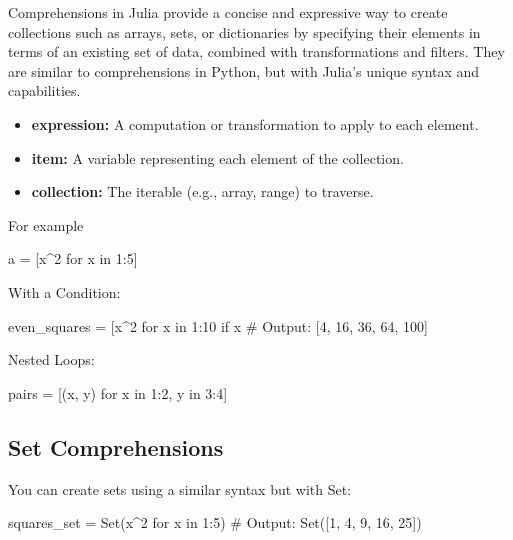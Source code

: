 \documentclass{report}
\begin{document}
     \pagebreak 
     \bigbreak \noindent 
     Comprehensions in Julia provide a concise and expressive way to create collections such as arrays, sets, or dictionaries by specifying their elements in terms of an existing set of data, combined with transformations and filters. They are similar to comprehensions in Python, but with Julia's unique syntax and capabilities.
     \bigbreak \noindent 
     \begin{jlcode}
     \end{jlcode}
     \begin{itemize}
         \item \textbf{expression:} A computation or transformation to apply to each element.
         \item \textbf{item:} A variable representing each element of the collection.
         \item \textbf{collection:} The iterable (e.g., array, range) to traverse.
     \end{itemize}
     For example
     \bigbreak \noindent 
     \begin{jlcode}
         a = [x^2 for x in 1:5]
     \end{jlcode}
     \bigbreak \noindent 
     With a Condition:
     \bigbreak \noindent 
     \begin{jlcode}
     even_squares = [x^2 for x in 1:10 if x %
     # Output: [4, 16, 36, 64, 100]
     \end{jlcode}
     \bigbreak \noindent 
     Nested Loops:
     \bigbreak \noindent 
     \begin{jlcode}
     pairs = [(x, y) for x in 1:2, y in 3:4]
     \end{jlcode}

     \bigbreak \noindent 
     \subsection{Set Comprehensions}
     \bigbreak \noindent 
     You can create sets using a similar syntax but with Set:
     \bigbreak \noindent 
     \begin{jlcode}
         squares_set = Set(x^2 for x in 1:5)
         # Output: Set([1, 4, 9, 16, 25])
     \end{jlcode}

     \bigbreak \noindent 
\end{document}
